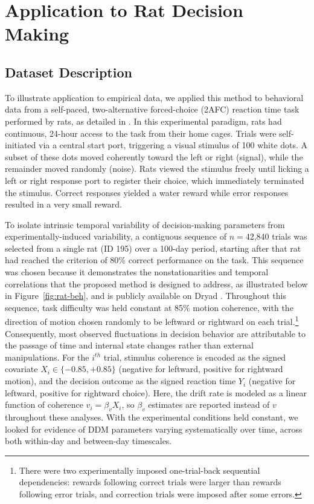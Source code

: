\documentclass[00-main.tex]{subfiles}
\begin{document}
\section{Application to Rat Decision Making}\label{sec:applications}

\subsection{Dataset Description}\label{sec:dataset}
To illustrate application to empirical data, we applied this method to behavioral data from a self-paced, two-alternative forced-choice (2AFC) reaction time task performed by rats, as detailed in \citet{reinagel_speed_2013}. In this experimental paradigm, rats had continuous, 24-hour access to the task from their home cages. Trials were self-initiated via a central start port, triggering a visual stimulus of 100 white dots. A subset of these dots moved coherently toward the left or right (signal), while the remainder moved randomly (noise). Rats viewed the stimulus freely until licking a left or right response port to register their choice, which immediately terminated the stimulus. Correct responses yielded a water reward while error responses resulted in a very small reward.

To isolate intrinsic temporal variability of decision-making parameters from experimentally-induced variability, a contiguous sequence of $n=$42,840 trials was selected from a single rat (ID 195) over a 100-day period, starting after that rat had reached the criterion of 80\% correct performance on the task. This sequence was chosen because it demonstrates the nonstationarities and temporal correlations that the proposed method is designed to address, as illustrated below in Figure~\ref{fig:rat-beh}, and is publicly available on Dryad \citep{reinagel_rat_2026}. Throughout this sequence, task difficulty was held constant at 85\% motion coherence, with the direction of motion chosen randomly to be leftward or rightward on each trial.\footnote{There were two experimentally imposed one-trial-back sequential dependencies: rewards following correct trials were larger than rewards following error trials, and correction trials were imposed after some errors.} Consequently, most observed fluctuations in decision behavior are attributable to the passage of time and internal state changes rather than external manipulations. For the $i^{th}$ trial, stimulus coherence is encoded as the signed covariate $X_i \in \{-0.85, +0.85\}$ (negative for leftward, positive for rightward motion), and the decision outcome as the signed reaction time $Y_i$ (negative for leftward, positive for rightward choice). Here, the drift rate is modeled as a linear function of coherence $v_i = \beta_v X_i$, so $\beta_v$ estimates are reported instead of $v$ throughout these analyses. With the experimental conditions held constant, we looked for evidence of DDM parameters varying systematically over time, across both within-day and between-day timescales.
\end{document}
